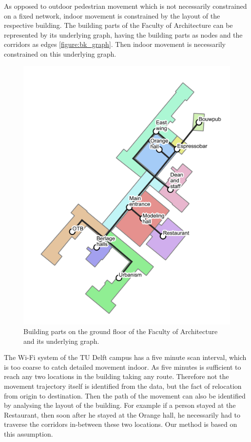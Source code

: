 As opposed to outdoor pedestrian movement which is not necessarily constrained
on a fixed network, indoor movement is constrained by the layout of the
respective building. The building parts of the Faculty of Architecture can be
represented by its underlying graph, having the building parts as nodes and the
corridors as edges \autoref{figure:bk_graph}. Then indoor movement is
necessarily constrained on this underlying graph.

\begin{figure}[H]
\centering
\includegraphics[scale=0.5]{bk_BG_bparts.png}
\captionsetup{justification=centering}
\caption{Building parts on the ground floor of the Faculty of Architecture and
its underlying graph.}
\label{figure:bk_graph}
\end{figure}

The Wi-Fi system of the TU Delft campus has a five minute scan interval, which
is too coarse to catch detailed movement indoor. As five minutes is
sufficient to reach any two locations in the building taking any route.
Therefore not the movement trajectory itself is identified from the data, but
the fact of relocation from origin to destination. Then the path of the movement
can also be identified by analysing the layout of the building. For example if a
person stayed at the Restaurant, then soon after he stayed at the Orange hall,
he necessarily had to traverse the corridors in-between these two locations. Our
method is based on this assumption.


